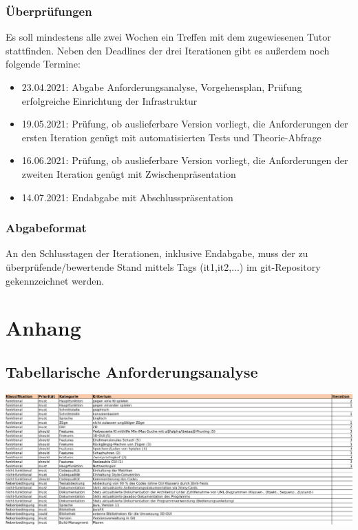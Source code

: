 \documentclass{scrreprt}
\begin{document}
\subsection{Überprüfungen}
Es soll mindestens alle zwei Wochen ein Treffen mit dem zugewiesenen Tutor stattfinden. Neben den Deadlines der drei Iterationen gibt es außerdem noch folgende Termine:

\begin{itemize}
\item 23.04.2021: Abgabe Anforderungsanalyse, Vorgehensplan, Prüfung erfolgreiche Einrichtung der Infrastruktur

\item 19.05.2021: Prüfung, ob auslieferbare Version vorliegt, die Anforderungen der ersten Iteration genügt mit automatisierten Tests und Theorie-Abfrage

\item 16.06.2021: Prüfung, ob auslieferbare Version vorliegt, die
Anforderungen der zweiten Iteration genügt mit Zwischenpräsentation

\item 14.07.2021: Endabgabe mit Abschlusspräsentation
\end{itemize}

\subsection{Abgabeformat}
An den Schlusstagen der Iterationen, inklusive Endabgabe, muss der zu überprüfende/bewertende Stand mittels Tags (it1,it2,...) im git-Repository gekennzeichnet werden.

\chapter{Anhang}
\section{Tabellarische Anforderungsanalyse}
\includegraphics{resources/anforderungsanalyse_tabelle.png}
\end{document}
